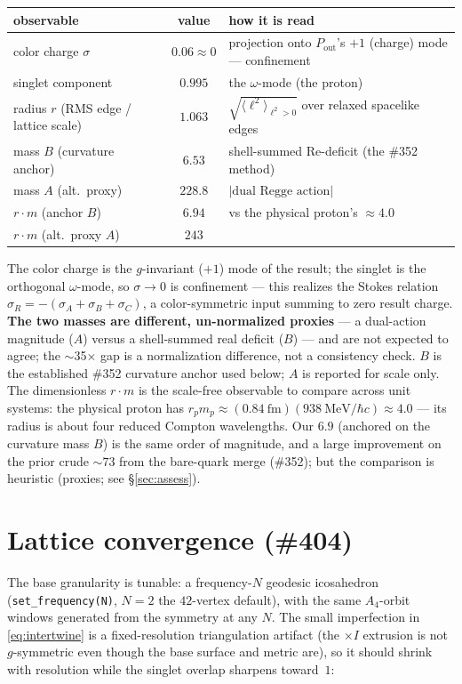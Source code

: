 \documentclass[11pt]{article}
\newcommand{\abs}[1]{\left\lvert #1 \right\rvert}
\newcommand{\sigmacol}{\sigma}
\newcommand{\Pout}{P_{\mathrm{out}}}
\begin{document}
\begin{center}
\small
\setlength{\tabcolsep}{5pt}
\begin{tabular}{@{}lcl@{}}
\toprule
observable & value & how it is read \\
\midrule
color charge $\sigmacol$ & $0.06 \approx 0$ & projection onto $\Pout$'s $+1$ (charge) mode --- confinement\\
singlet component & $0.995$ & the $\omega$-mode (the proton) \\
radius $r$ (RMS edge / lattice scale) & $1.063$ & $\sqrt{\langle\ell^2\rangle_{\ell^2>0}}$ over relaxed spacelike edges\\
mass $B$ (curvature anchor) & $6.53$ & shell-summed Re-deficit (the \#352 method)\\
mass $A$ (alt.\ proxy) & $228.8$ & $\abs{\text{dual Regge action}}$\\
$r\!\cdot\!m$ (anchor $B$) & $\mathbf{6.94}$ & vs the physical proton's $\approx 4.0$\\
$r\!\cdot\!m$ (alt.\ proxy $A$) & $243$ & \\
\bottomrule
\end{tabular}
\end{center}

\noindent The color charge is the $g$-invariant ($+1$) mode of the result; the singlet
is the orthogonal $\omega$-mode, so $\sigmacol\to 0$ is confinement --- this realizes
the Stokes relation $\sigmacol_R=-(\sigmacol_A+\sigmacol_B+\sigmacol_C)$, a
color-symmetric input summing to zero result charge. \textbf{The two masses are
different, un-normalized proxies} --- a dual-action magnitude ($A$) versus a
shell-summed real deficit ($B$) --- and are not expected to agree; the $\sim$35$\times$
gap is a normalization difference, not a consistency check. $B$ is the established
\#352 curvature anchor used below; $A$ is reported for scale only. The dimensionless
$r\!\cdot\!m$ is the scale-free observable to compare across unit systems: the physical
proton has $r_p m_p \approx (0.84~\text{fm})(938~\text{MeV}/\hbar c) \approx 4.0$ ---
its radius is about four reduced Compton wavelengths. Our $6.9$ (anchored on the
curvature mass $B$) is the same order of magnitude, and a large improvement on the
prior crude $\sim 73$ from the bare-quark merge (\#352); but the comparison is
heuristic (proxies; see \S\ref{sec:assess}).

\section{Lattice convergence (\#404)}
The base granularity is tunable: a frequency-$N$ geodesic icosahedron
(\texttt{set\_frequency(N)}, $N=2$ the $42$-vertex default), with the same
$A_4$-orbit windows generated from the symmetry at any $N$. The small imperfection in
\eqref{eq:intertwine} is a fixed-resolution triangulation artifact (the $\times I$
extrusion is not $g$-symmetric even though the base surface and metric are), so it
should shrink with resolution while the singlet overlap sharpens toward~$1$:
\end{document}
